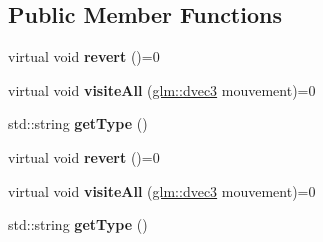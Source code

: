 \subsection*{Public Member Functions}
\begin{DoxyCompactItemize}
\item 
\hypertarget{class_visiteur_mouvement_adef14507d05f0ca946d779575fd8e800}{virtual void {\bfseries revert} ()=0}\label{class_visiteur_mouvement_adef14507d05f0ca946d779575fd8e800}

\item 
\hypertarget{class_visiteur_mouvement_a7f60b6bb24b8b4c81c5d62ce37c418c8}{virtual void {\bfseries visite\-All} (\hyperlink{group__core__types_ga7f3287f952e6ccb481231368091702ac}{glm\-::dvec3} mouvement)=0}\label{class_visiteur_mouvement_a7f60b6bb24b8b4c81c5d62ce37c418c8}

\item 
\hypertarget{class_visiteur_mouvement_a9d7f8454641ff2b3da3f4e4171c05695}{std\-::string {\bfseries get\-Type} ()}\label{class_visiteur_mouvement_a9d7f8454641ff2b3da3f4e4171c05695}

\item 
\hypertarget{group__inf2990_gadef14507d05f0ca946d779575fd8e800}{virtual void {\bfseries revert} ()=0}\label{group__inf2990_gadef14507d05f0ca946d779575fd8e800}

\item 
\hypertarget{group__inf2990_ga7f60b6bb24b8b4c81c5d62ce37c418c8}{virtual void {\bfseries visite\-All} (\hyperlink{group__core__types_ga7f3287f952e6ccb481231368091702ac}{glm\-::dvec3} mouvement)=0}\label{group__inf2990_ga7f60b6bb24b8b4c81c5d62ce37c418c8}

\item 
\hypertarget{group__inf2990_ga9d7f8454641ff2b3da3f4e4171c05695}{std\-::string {\bfseries get\-Type} ()}\label{group__inf2990_ga9d7f8454641ff2b3da3f4e4171c05695}

\end{DoxyCompactItemize}

